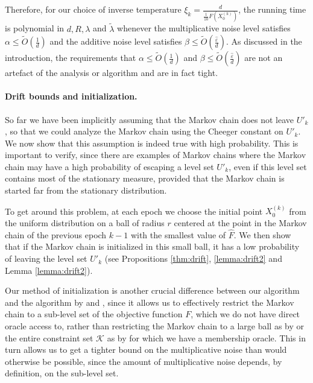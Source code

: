 \documentclass[final,12pt]{colt2018} %
\begin{document}
{Therefore, for our choice of inverse temperature $\xi_k = \frac{d}{\frac{1}{10}F(X^{(k)}_0)}$,  the running time is polynomial in $d, R, \lambda$ and $\tilde{\lambda}$ whenever the multiplicative noise level satisfies $\alpha \leq \tilde{O}(\frac{1}{d})$  and the additive noise level satisfies $\beta \leq \tilde{O}(\frac{\hat{\varepsilon}}{d})$.  
%
As discussed in the introduction,  the requirements that $\alpha \leq \tilde{O}(\frac{1}{d})$  and $\beta \leq \tilde{O}(\frac{\hat{\varepsilon}}{d})$ are not an artefact of the analysis or algorithm and are in fact tight. 

\paragraph{Drift bounds and initialization.}
So far we have been implicitly assuming that the Markov chain does not leave $U'_k$, so that we could analyze the Markov chain using the Cheeger constant on $U'_k$.  
%
We  now show that this assumption is indeed true with high probability.
%
This is important to verify, since there are examples of Markov chains where the Markov chain may have a high probability of escaping a level set $U'_k$, even if this level set contains most of the stationary measure, provided that the Markov chain is started far from the stationary distribution.

To get around this problem, at each epoch we choose the initial point $X_0^{(k)}$ from the uniform distribution on a  ball of radius $r$ centered at the point in the Markov chain of the previous epoch $k-1$ with the smallest value of $\hat{F}$.  
%
We then show that if the Markov chain is initialized in this small ball, it has a low probability of leaving the level set $U'_k$ (see Propositions \ref{thm:drift}, \ref{lemma:drift2} and Lemma  \ref{lemma:drift2}).

Our method of initialization is another crucial difference between our algorithm and the algorithm by \cite{hitting_times} and \cite{Simulated_Annealing_Nonassymptotic}, since it allows us to effectively restrict the Markov chain to a sub-level set of the objective function $F$, which we do not have direct oracle access to, rather than restricting the Markov chain to a large ball as by \cite{Simulated_Annealing_Nonassymptotic} or the entire constraint set $\mathcal{K}$ as by \cite{hitting_times} for which we have a membership oracle.  
%
This in turn allows us to get a tighter bound on the multiplicative noise than would otherwise be possible, since the amount of multiplicative noise depends, by definition, on the sub-level set.


}
\end{document}
